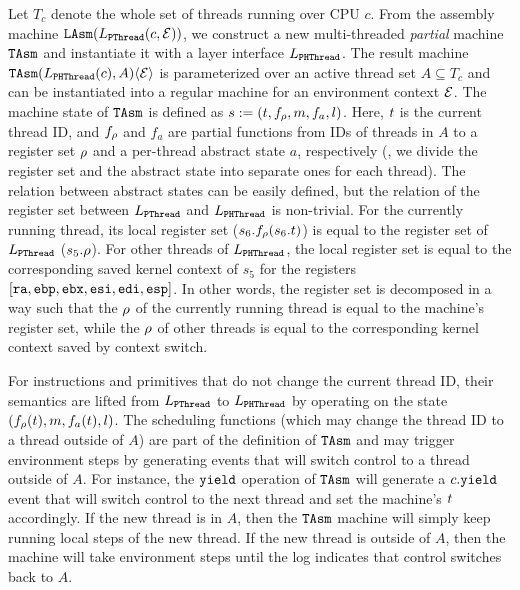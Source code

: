 {Let $T_c$ denote the whole set of threads running over CPU $c$.
From the assembly machine ${\texttt{LAsm}}(L_{\texttt{PThread}}(c,\mathcal{E}))$, we construct a new 
multi-threaded \emph{partial} machine ${\texttt{TAsm}}$
and instantiate it with a layer interface $L_{\texttt{PHThread}}$.
The result machine 
${\texttt{TAsm}}(L_{\texttt{PHThread}}(c), A)\langle \mathcal{E} \rangle$ is 
parameterized over an active thread set $A \subseteq T_c$
and can be instantiated into a regular machine for
an environment context $\mathcal{E}$.
The machine state of ${\texttt{TAsm}}$ is defined as $s:=(t, f_\rho, m, f_a, l)$.
Here, $t$ is the current thread ID, and
$f_\rho$ and $f_a$ are partial functions
from IDs of threads in $A$ to a register set $\rho$
and a per-thread abstract state $a$, respectively (\ie,
we divide the register set and the abstract state
into separate ones for each thread).
The relation between abstract states
can be easily defined, but the relation of the register set between $L_{\texttt{PThread}}$ and $L_{\texttt{PHThread}}$ is non-trivial.
For the currently running thread, its local register set ($s_6.f_\rho(s_6.t)$) is equal
to the register set of $L_{\texttt{PThread}}$ ($s_5.\rho$).
For other threads of $L_{\texttt{PHThread}}$, the local register set is equal
to the corresponding saved kernel context of $s_5$ for the registers
$[{\texttt{ra}}, {\texttt{ebp}}, {\texttt{ebx}}, {\texttt{esi}}, {\texttt{edi}}, {\texttt{esp}}]$.
In other words, the register set is decomposed in a way such that the $\rho$ of the
currently running thread is equal to the machine's register set, while the $\rho$ of
other threads is equal to the corresponding kernel context saved by context switch.


For instructions and primitives that do not change the current thread
ID, their semantics are lifted from $L_{\texttt{PThread}}$ to $L_{\texttt{PHThread}}$
by operating on the state $(f_\rho(t), m, f_a(t), l)$.
The scheduling functions (which may change the thread ID to a thread outside of $A$)
are part of the definition of ${\texttt{TAsm}}$
and may trigger environment steps by generating events
that will switch control to a thread outside of $A$.
For instance,
the ${\texttt{yield}}$ operation of ${\texttt{TAsm}}$
will generate a $c.{\texttt{yield}}$ event that will switch control to the next thread
and set the machine's $t$ accordingly.
If the new thread is in $A$,
then the ${\texttt{TAsm}}$ machine will simply keep running local steps of the new thread.
If the new thread is outside of $A$,
then the machine will take environment steps
until the log indicates that control switches back to  $A$.

}
